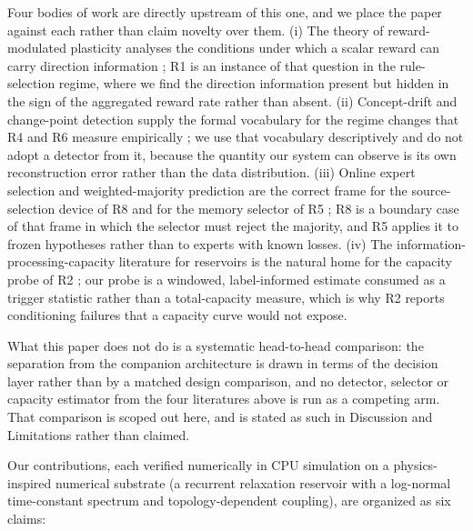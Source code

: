 \documentclass[preprint,12pt]{elsarticle}
\begin{document}
Four bodies of work are directly upstream of this one, and we place the paper
against each rather than claim novelty over them. (i) The theory of
reward-modulated plasticity analyses the conditions under which a scalar
reward can carry direction information \cite{hoerzer2014,pfister2006}; R1 is an
instance of that question in the rule-selection regime, where we find the
direction information present but hidden in the sign of the aggregated reward
rate rather than absent. (ii) Concept-drift and change-point detection supply
the formal vocabulary for the regime changes that R4 and R6 measure
empirically \cite{gama2014,truong2020}; we use that vocabulary descriptively
and do not adopt a detector from it, because the quantity our system can
observe is its own reconstruction error rather than the data distribution.
(iii) Online expert selection and weighted-majority prediction are the correct
frame for the source-selection device of R8 and for the memory selector of R5
\cite{cesabianchi2006,zinkevich2003}; R8 is a boundary case of that frame in
which the selector must reject the majority, and R5 applies it to frozen
hypotheses rather than to experts with known losses. (iv) The
information-processing-capacity literature for reservoirs is the natural home
for the capacity probe of R2 \cite{dambre2012,jaeger2004}; our probe is a
windowed, label-informed estimate consumed as a trigger statistic rather than
a total-capacity measure, which is why R2 reports conditioning failures that a
capacity curve would not expose.

What this paper does not do is a systematic head-to-head comparison: the
separation from the companion architecture \cite{companionB} is drawn in terms
of the decision layer rather than by a matched design comparison, and no
detector, selector or capacity estimator from the four literatures above is
run as a competing arm. That comparison is scoped out here, and is stated as
such in Discussion and Limitations rather than claimed.

Our contributions, each verified numerically in CPU simulation on a
physics-inspired numerical substrate (a recurrent relaxation reservoir with
a log-normal time-constant spectrum and topology-dependent coupling), are
organized as six claims:
\end{document}
